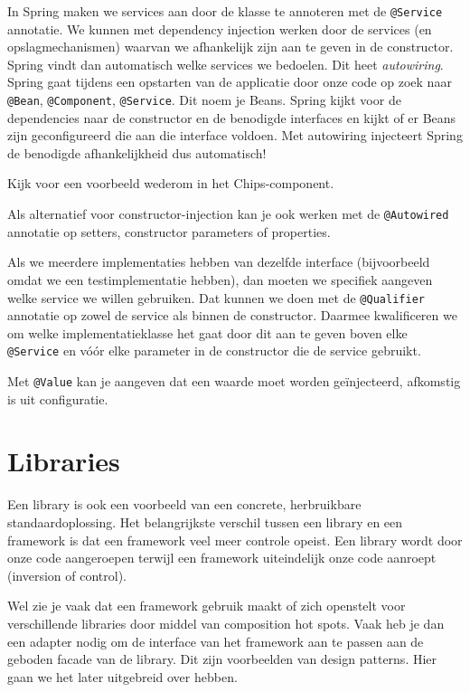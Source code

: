 In Spring maken we services aan door de klasse te annoteren met de \texttt{@Service} annotatie. 
We kunnen met dependency injection werken door de services (en opslagmechanismen) waarvan we afhankelijk zijn 
aan te geven in de constructor. Spring vindt dan automatisch welke services we bedoelen. 
Dit heet \textit{autowiring}.
Spring gaat tijdens een opstarten van de applicatie door onze code op zoek naar 
\texttt{@Bean}, \texttt{@Component}, \texttt{@Service}. Dit noem je Beans. 
Spring kijkt voor de dependencies naar de constructor en de benodigde interfaces 
en kijkt of er Beans zijn geconfigureerd die aan die interface voldoen. Met autowiring 
injecteert Spring de benodigde afhankelijkheid dus automatisch!

Kijk voor een voorbeeld wederom in het Chips-component.

Als alternatief voor constructor-injection kan 
je ook werken met de \texttt{@Autowired} annotatie 
op setters, constructor parameters of properties. 

Als we meerdere implementaties hebben van dezelfde interface 
(bijvoorbeeld omdat we een testimplementatie hebben), 
dan moeten we specifiek aangeven welke service we willen gebruiken. 
Dat kunnen we doen met de \texttt{@Qualifier} annotatie op zowel de service als binnen de constructor. 
Daarmee kwalificeren we om welke implementatieklasse het gaat door 
dit aan te geven boven elke \texttt{@Service} en vóór elke parameter in de 
constructor die de service gebruikt.

Met \texttt{@Value} kan je aangeven dat een waarde moet worden geïnjecteerd,
afkomstig is uit configuratie.

\section{Libraries}
Een library is ook een voorbeeld van een concrete, herbruikbare standaardoplossing.
Het belangrijkste verschil tussen een library en een framework is dat 
een framework veel meer controle opeist. Een library wordt door onze code aangeroepen
terwijl een framework uiteindelijk onze code aanroept (inversion of control).

Wel zie je vaak dat een framework gebruik maakt of zich openstelt voor verschillende
libraries door middel van composition hot spots. Vaak heb je dan een adapter nodig 
om de interface van het framework aan te passen aan de geboden facade van de library.
Dit zijn voorbeelden van design patterns. Hier gaan we het later uitgebreid over hebben.

